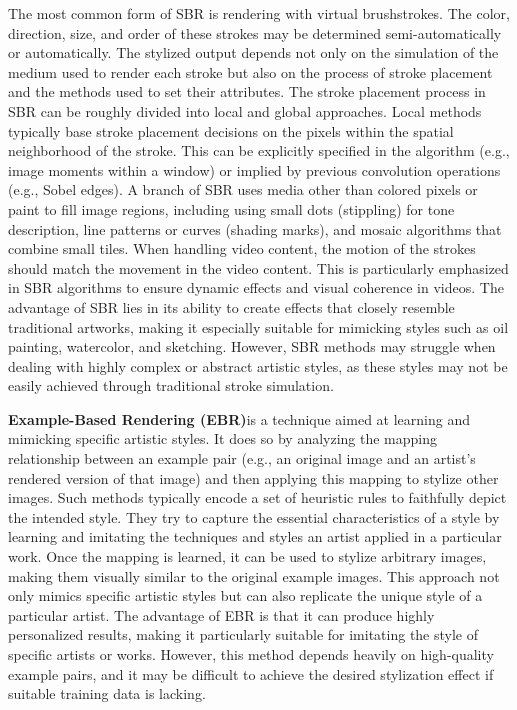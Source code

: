 The most common form of SBR is rendering with virtual brushstrokes. The color, direction, size, and order of these strokes may be determined semi-automatically or automatically. The stylized output depends not only on the simulation of the medium used to render each stroke but also on the process of stroke placement and the methods used to set their attributes. The stroke placement process in SBR can be roughly divided into local and global approaches. Local methods typically base stroke placement decisions on the pixels within the spatial neighborhood of the stroke. This can be explicitly specified in the algorithm (e.g., image moments within a window) or implied by previous convolution operations (e.g., Sobel edges). A branch of SBR uses media other than colored pixels or paint to fill image regions, including using small dots (stippling) for tone description, line patterns or curves (shading marks), and mosaic algorithms that combine small tiles. When handling video content, the motion of the strokes should match the movement in the video content. This is particularly emphasized in SBR algorithms to ensure dynamic effects and visual coherence in videos. The advantage of SBR lies in its ability to create effects that closely resemble traditional artworks, making it especially suitable for mimicking styles such as oil painting, watercolor, and sketching. However, SBR methods may struggle when dealing with highly complex or abstract artistic styles, as these styles may not be easily achieved through traditional stroke simulation.


\textbf{Example-Based Rendering (EBR)}is a technique aimed at learning and mimicking specific artistic styles. It does so by analyzing the mapping relationship between an example pair (e.g., an original image and an artist's rendered version of that image) and then applying this mapping to stylize other images. Such methods typically encode a set of heuristic rules to faithfully depict the intended style. They try to capture the essential characteristics of a style by learning and imitating the techniques and styles an artist applied in a particular work. Once the mapping is learned, it can be used to stylize arbitrary images, making them visually similar to the original example images. This approach not only mimics specific artistic styles but can also replicate the unique style of a particular artist. The advantage of EBR is that it can produce highly personalized results, making it particularly suitable for imitating the style of specific artists or works. However, this method depends heavily on high-quality example pairs, and it may be difficult to achieve the desired stylization effect if suitable training data is lacking.

